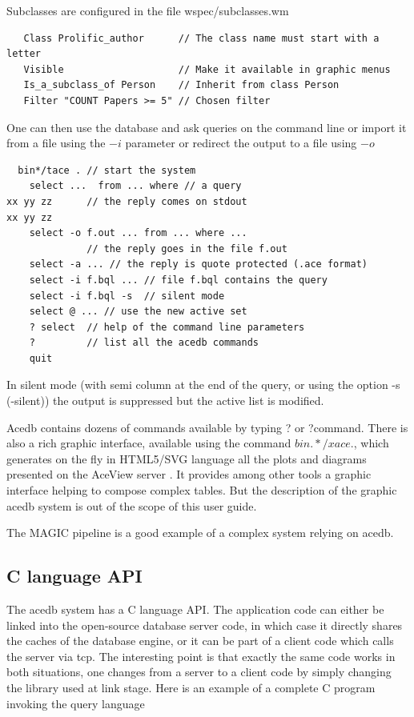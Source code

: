 \documentclass[11pt]{article}
\newcommand{\BL}{\begin{lstlisting}}
\begin{document}
Subclasses are configured in the file wspec/subclasses.wm

\BL
   Class Prolific_author      // The class name must start with a letter
   Visible                    // Make it available in graphic menus
   Is_a_subclass_of Person    // Inherit from class Person
   Filter "COUNT Papers >= 5" // Chosen filter
\end{lstlisting}

One can then use the database and ask queries on the command
line or import it from a file using the $-$$i$ parameter
or redirect the output to a file using $-$$o$
\BL
  bin*/tace . // start the system
    select ...  from ... where // a query
xx yy zz      // the reply comes on stdout
xx yy zz
    select -o f.out ... from ... where ...
              // the reply goes in the file f.out
    select -a ... // the reply is quote protected (.ace format)
    select -i f.bql ... // file f.bql contains the query
    select -i f.bql -s  // silent mode
    select @ ... // use the new active set 
    ? select  // help of the command line parameters
    ?         // list all the acedb commands
    quit
\end{lstlisting}
In silent mode (with semi column at the end of the query, or using
the option -s (-silent)) the output is suppressed but the
active list is modified.

Acedb contains dozens of commands available by typing ? or ?command.
There is also a rich graphic interface, available using the
command $bin.*/xace .$, which generates on the fly in HTML5/SVG language
all the plots and diagrams presented on the AceView server \cite{cDNA}.
It provides among other tools
a graphic interface helping to compose complex tables.
But the description of the graphic acedb system is out of the scope of this 
user guide.

The MAGIC pipeline  \cite{DJTM} is a good example of a complex system 
relying on acedb.



\subsection{C language API}

The acedb system has a C language API. The application code
can either be linked into the open-source database server code,
in which case it directly shares the caches of the database engine,
or it can be part of a client code which calls the server
via tcp. The interesting point is that exactly the same code
works in both situations, one changes from a server to a client
code by simply changing the library used at link stage.
Here is an example of a complete C program invoking the query language  
\end{document}
